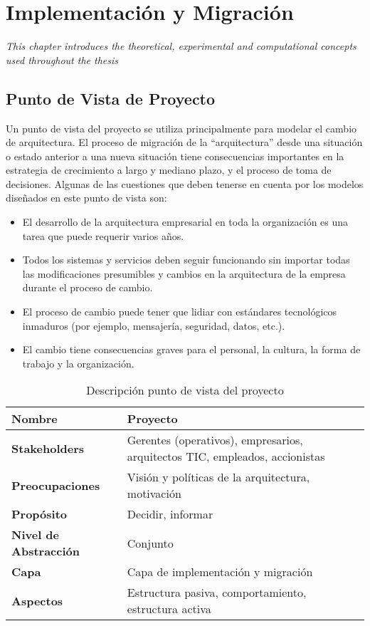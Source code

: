 \chapter{Implementación y Migración}
\label{chap:Implementacion}
\textit{This chapter introduces the theoretical, experimental and computational concepts used throughout the thesis}
\vspace{2ex}\vfill
\minitoc
\newpage

\section{Punto de Vista de Proyecto}
Un punto de vista del proyecto se utiliza principalmente para modelar el cambio de arquitectura. El proceso de migración de la “arquitectura” desde una situación o estado anterior a una nueva situación tiene consecuencias importantes en la estrategia de crecimiento a largo y mediano plazo, y el proceso de toma de decisiones. Algunas de las cuestiones que deben tenerse en cuenta por los modelos diseñados en este punto de vista son:

  \begin{itemize}
	\item El desarrollo de la arquitectura empresarial en toda la organización es una tarea que puede requerir varios años.
	\item Todos los sistemas y servicios deben seguir funcionando sin importar todas las modificaciones presumibles y cambios en la arquitectura de la empresa durante el proceso de cambio.
	\item El proceso de cambio puede tener que lidiar con estándares tecnológicos inmaduros (por ejemplo, mensajería, seguridad, datos, etc.).
	\item El cambio tiene consecuencias graves para el personal, la cultura, la forma de trabajo 	y la organización.
  \end{itemize}

  \begin{table}[H]
	\centering
	\begin{tabular}{lp{8cm}}
		\toprule
		\textbf{Nombre} & \textbf{Proyecto} \\
		\midrule
		\textbf{Stakeholders} & Gerentes (operativos), empresarios, arquitectos TIC, empleados, accionistas \\
		\textbf{Preocupaciones} & Visión y políticas de la arquitectura, motivación \\
		\textbf{Propósito} & Decidir, informar \\
		\textbf{Nivel de Abstracción} & Conjunto \\
		\textbf{Capa} & Capa de implementación y migración \\
		\textbf{Aspectos} & Estructura pasiva, comportamiento, estructura activa \\
		\bottomrule
	\end{tabular}
	\captionsetup{width=.95\textwidth}
	\caption{Descripción punto de vista del proyecto}
	\label{tabla26}
  \end{table}

